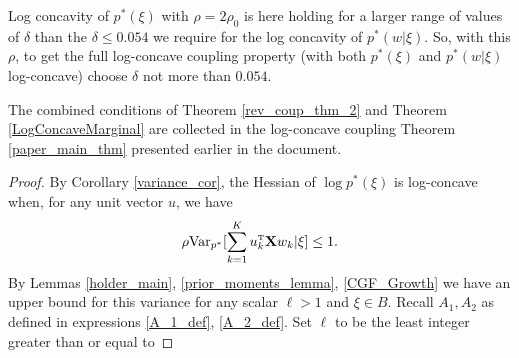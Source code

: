 \documentclass{article}
\numberwithin{equation}{section}
\theoremstyle{Lemma}
\theoremstyle{Corollary}
\theoremstyle{Theorem}
\theoremstyle{Remark}
\begin{document}
Log concavity of $p^*(\xi)$ with $\rho=2\rho_0$ is here holding for a larger range of values of $\delta$ than the $\delta \le 0.054$ we require for the log concavity of $p^*(w|\xi)$.  So, with this $\rho$, to get the full log-concave coupling property (with both $p^*(\xi)$ and $p^*(w|\xi)$ log-concave) choose $\delta$ not more than $0.054$.

The combined conditions of Theorem \ref{rev_coup_thm_2} and Theorem \ref{LogConcaveMarginal} are collected in the log-concave coupling Theorem \ref{paper_main_thm} presented earlier in the document.

\begin{proof}
    By Corollary \ref{variance_cor}, the Hessian of $\log p^{*}(\xi)$ is log-concave when, for any unit vector $u$, we have
    \begin{align}
        \rho \text{Var}_{p^{*}}[\sum_{k=1}^{K}u_{k}^{\text{\tiny{T}}}\textbf{X}w_{k}|\xi] \leq 1.\label{mid_pf_cond}
    \end{align}
    By Lemmas \ref {holder_main}, \ref{prior_moments_lemma}, \ref{CGF_Growth} we have an upper bound for this variance for any scalar $\ell > 1$ and $\xi \in B$. Recall $A_{1}, A_{2}$ as defined in expressions \eqref{A_1_def}, \eqref{A_2_def}. Set $\ell$ to be the least integer greater than or equal to


\end{proof}
\end{document}

